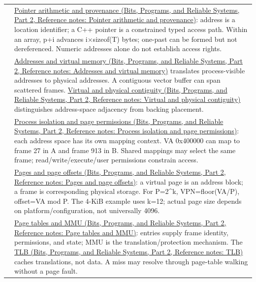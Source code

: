 {\begin{longtable}[]{@{}
  >{\raggedright\arraybackslash}p{}
  >{\raggedright\arraybackslash}p{}@{}}
51 & \href{../01-Bits-Programs-and-Reliable-Systems-P02/main.pdf\#appendix-6af5921bc853}{Pointer arithmetic and provenance (Bits, Programs, and Reliable Systems, Part 2, Reference notes: Pointer arithmetic and provenance)}: address is a location identifier; a C++ pointer is a constrained typed access path. Within an array, p+i advances i×sizeof(T) bytes; one-past can be formed but not dereferenced. Numeric addresses alone do not establish access rights. \\
52 & \href{../01-Bits-Programs-and-Reliable-Systems-P02/main.pdf\#appendix-18ee4f913c3c}{Addresses and virtual memory (Bits, Programs, and Reliable Systems, Part 2, Reference notes: Addresses and virtual memory)} translates process-visible addresses to physical addresses. A contiguous vector buffer can span scattered frames. \href{../01-Bits-Programs-and-Reliable-Systems-P02/main.pdf\#appendix-f897c1ddac8f}{Virtual and physical contiguity (Bits, Programs, and Reliable Systems, Part 2, Reference notes: Virtual and physical contiguity)} distinguishes address-space adjacency from backing placement. \\
53 & \href{../01-Bits-Programs-and-Reliable-Systems-P02/main.pdf\#appendix-c2a9ad1e2b49}{Process isolation and page permissions (Bits, Programs, and Reliable Systems, Part 2, Reference notes: Process isolation and page permissions)}: each address space has its own mapping context. VA 0x400000 can map to frame 27 in A and frame 913 in B. Shared mappings may select the same frame; read/write/execute/user permissions constrain access. \\
54 & \href{../01-Bits-Programs-and-Reliable-Systems-P02/main.pdf\#appendix-0c67cd5bf30a}{Pages and page offsets (Bits, Programs, and Reliable Systems, Part 2, Reference notes: Pages and page offsets)}: a virtual page is an address block; a frame is corresponding physical storage. For P=2\^{}k, VPN=floor(VA/P), offset=VA mod P. The 4-KiB example uses k=12; actual page size depends on platform/configuration, not universally 4096. \\
55 & \href{../01-Bits-Programs-and-Reliable-Systems-P02/main.pdf\#appendix-01e5905165c4}{Page tables and MMU (Bits, Programs, and Reliable Systems, Part 2, Reference notes: Page tables and MMU)}: entries supply frame identity, permissions, and state; MMU is the translation/protection mechanism. The \href{../01-Bits-Programs-and-Reliable-Systems-P02/main.pdf\#appendix-7a2d9c5ce511}{TLB (Bits, Programs, and Reliable Systems, Part 2, Reference notes: TLB)} caches translations, not data. A miss may resolve through page-table walking without a page fault. \\

\end{longtable}}
